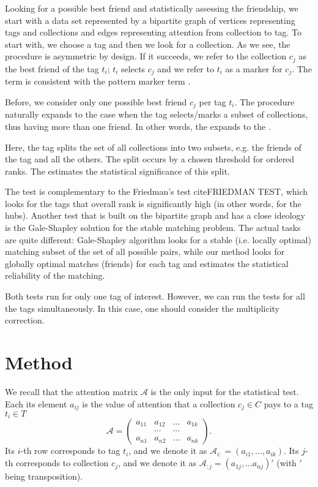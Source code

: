 \documentclass{llncs}
\begin{document}
Looking for a possible best friend and statistically assessing the friendship, we start with a data set represented by a bipartite graph of vertices representing tags and collections and edges representing attention from collection to tag.
To start with, we choose a tag and then we look for a collection. As we see, the procedure is asymmetric by design. If it succeeds, we refer to the collection $c_j$ as the best friend of the tag $t_i$; $t_i$ selects $c_j$ and we refer to $t_i$ as a marker for $c_j$. The term is consistent with the pattern marker term \cite{stein-obrien_patternmarkers_2017}.

Before, we consider only one possible best friend $c_j$ per tag $t_i$. The procedure naturally expands to the case when the tag selects/marks a subset of collections, thus having more than one friend. In other words, the  expands to the .

Here, the tag splits the set of all collections into two subsets, e.g. the friends of the tag and all the others. The split occurs by a chosen threshold for ordered ranks. The  estimates the statistical significance of this split.

\textcolor{navyblue}{The test is complementary to the Friedman's test  cite{FRIEDMAN TEST}, which looks for the tags that overall rank is significantly high (in other words, for the hubs). Another test that is built on the bipartite graph and has a close ideology is the Gale-Shapley solution for the stable matching problem. The actual tasks are quite different: Gale-Shapley algorithm looks for a stable (i.e. locally optimal) matching subset of the set of all possible pairs, while our method looks for globally optimal matches (friends) for each tag and estimates the statistical reliability of the matching.}

Both tests run for only one tag of interest. However, we can run the tests for all the tags simultaneously. In this case, one should consider the multiplicity correction. 

\section{Method}
\label{sec:method}


We recall that the attention matrix $\mathcal{A}$ is the only input for the statistical test. Each its element $a_{ij}$ is the value of attention that a collection $c_j \in C$ pays to a tag $t_i \in T$
\[
\mathcal{A} = \begin{pmatrix}
a_{11} & a_{12} & \dots & a_{1k} \\
       &\cdots & \cdots &  \\
a_{n1} & a_{n2} & \dots & a_{nk}
\end{pmatrix}.
\]
Its $i$-th row corresponds to tag $t_i$, and we denote it as $\mathcal{A}_{i:} = (a_{i1}, \dots, a_{ik})$. Its $j$-th  corresponds to collection $c_j$, and we denote it as $\mathcal{A}_{:j} =(a_{1j}, \dots a_{nj})'$ (with $'$ being transposition).
\end{document}
